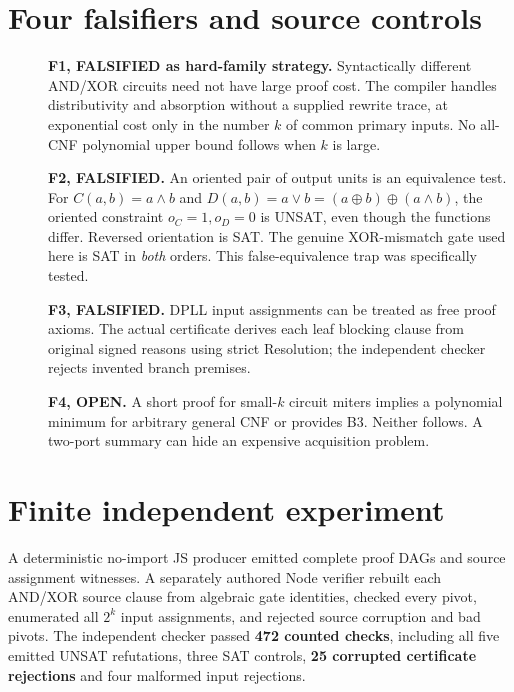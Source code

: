 \documentclass[11pt]{article}
\begin{document}
\section*{Four falsifiers and source controls}
\begin{description}
\item[] \textbf{F1, FALSIFIED as hard-family strategy.} Syntactically different AND/XOR circuits need not have large proof cost. The compiler handles distributivity and absorption without a supplied rewrite trace, at exponential cost only in the number $k$ of common primary inputs. No all-CNF polynomial upper bound follows when $k$ is large.
\item[] \textbf{F2, FALSIFIED.} An oriented pair of output units is an equivalence test. For $C(a,b)=a\land b$ and $D(a,b)=a\lor b=(a\oplus b)\oplus(a\land b)$, the oriented constraint $o_C=1,o_D=0$ is UNSAT, even though the functions differ. Reversed orientation is SAT. The genuine XOR-mismatch gate used here is SAT in \emph{both} orders. This false-equivalence trap was specifically tested.
\item[] \textbf{F3, FALSIFIED.} DPLL input assignments can be treated as free proof axioms. The actual certificate derives each leaf blocking clause from original signed reasons using strict Resolution; the independent checker rejects invented branch premises.
\item[] \textbf{F4, OPEN.} A short proof for small-$k$ circuit miters implies a polynomial minimum for arbitrary general CNF or provides B3. Neither follows. A two-port summary can hide an expensive acquisition problem.
\end{description}

\section*{Finite independent experiment}
A deterministic no-import JS producer emitted complete proof DAGs and source assignment witnesses. A separately authored Node verifier rebuilt each AND/XOR source clause from algebraic gate identities, checked every pivot, enumerated all $2^k$ input assignments, and rejected source corruption and bad pivots. The independent checker passed \textbf{472 counted checks}, including all five emitted UNSAT refutations, three SAT controls, \textbf{25 corrupted certificate rejections} and four malformed input rejections.
\end{document}
